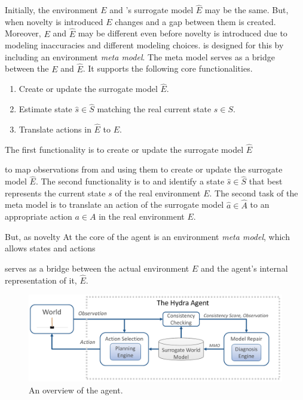 Initially, the environment $E$ and \hydra's surrogate model $\hat{E}$ may be the same. 
But, when novelty is introduced $E$ changes and a gap between them is created. 
Moreover, $E$ and $\hat{E}$ may be different even before novelty is introduced due to modeling inaccuracies and different modeling choices. 
\hydra is designed for this by including an 
environment \emph{meta model}. The meta model serves as a bridge between the $E$ and $\hat{E}$. 
It supports the following core functionalities. 
\begin{enumerate}
	\item Create or update the surrogate model $\hat{E}$.
	\item Estimate state $\hat{s}\in\hat{S}$ matching the real current state $s\in S$. 
	\item Translate actions in $\hat{E}$ to $E$. 
\end{enumerate}

The first functionality is to create or update the surrogate model $\hat{E}$

to map observations from and using them to create or update the surrogate model $\hat{E}$. 
The second functionality is to and identify a state $\hat{s}\in\hat{S}$ that best represents the current state $s$ of the real environment $E$. 
The second task of the meta model is to translate an action of the surrogate model $\hat{a}\in \hat{A}$ to an appropriate action $a\in A$ in the real environment $E$.  



But, as novelty
At the core of the \hydra agent is an environment \emph{meta model}, which allows states and actions 

serves as a bridge between the actual environment $E$ and the agent's internal representation of it, $\hat{E}$. 

\begin{figure}
	\centering
	\includegraphics[width=\columnwidth]{hydra-cropped.pdf}
	\caption{An overview of the \hydra agent.}
	\label{fig:hydra-overview}
\end{figure}

